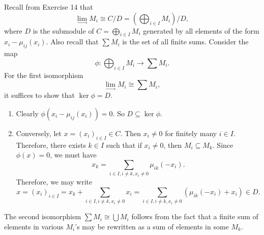 \documentclass[10pt]{amsart}
\begin{document}

\begin{exercise}[Exercise 17]
\end{exercise}

\begin{solution}
    Recall from Exercise 14 that 
    \[\lim_{\longrightarrow} M_i \cong C/D = \left(\bigoplus_{i \in I}M_i \right)/D,\]
    where $D$ is the submodule of $C = \bigoplus_{i \in I}M_i$ generated by all elements of the form $x_i - \mu_{ij}(x_i)$. Also recall that $\sum M_i$ is the set of all finite sums.
    Consider the map 
    \[\phi: \bigoplus_{i \in I}M_i \to \sum M_i.\]
    For the first isomorphism \[\lim_{\longrightarrow} M_i \cong \sum M_i,\] it suffices to show that $\ker \phi  = D$. 
    \begin{enumerate}
        \item Clearly $\phi(x_i - \mu_{ij}(x_i)) = 0$. So $D \subseteq \ker \phi$.
        \item Conversely, let $x = (x_i)_{i \in I} \in C$. Then $x_i \neq 0$ for finitely many $i \in I$. Therefore, there exists $k \in I$ such that if $x_i \neq 0$, then $M_i \subseteq M_k$. Since $\phi(x) = 0$, we must have
        \[
        x_k = \sum_{i \in I, i \neq k, x_i \neq 0}\mu_{ik}(-x_i).
        \]
        Therefore, we may write 
        \[
        x = (x_i)_{i \in I} = x_k + \sum_{i \in I, i \neq k, x_i \neq 0}x_i = \sum_{i \in I, i \neq k, x_i \neq 0} (\mu_{ik}(-x_i) + x_i) \in D.
        \]
    \end{enumerate}

    The second isomorphism $\sum M_i \cong \bigcup M_i$ follows from the fact that a finite sum of elements in various $M_i$'s may be rewritten as a sum of elements in some $M_k$.

\end{solution}

\newpage


\begin{exercise}[Exercise 21]

\end{exercise}
\end{document}
